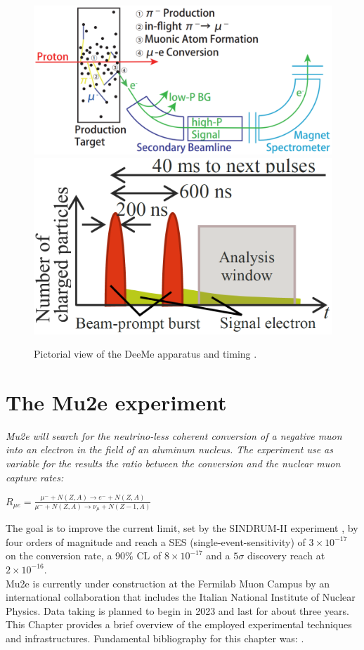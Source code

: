 \documentclass[12pt,a4paper,openright, oneside, titlepage]{book} %
\begin{document}
\begin{figure}[h!]
\centering
\includegraphics[scale=0.4]{DeeMe}
\includegraphics[scale=0.4]{DeeMe_event}
\caption[DeeMe experiment]{Pictorial view of the DeeMe apparatus and timing \cite{DeeMe}. }
\label{_DeeMe}
\end{figure}

\chapter{The Mu2e experiment}
{\itshape 
Mu2e will search for the neutrino-less coherent conversion of a negative muon into an electron in the field of an aluminum nucleus. 
The experiment use as variable for the results the ratio between the conversion and the nuclear muon capture rates:
\begin{center}
$R_{\mu e} = \frac{\mu^- + N(Z, A) \rightarrow e^- + N(Z, A)}
{\mu^- + N(Z,A) \rightarrow \nu_{\mu} + N(Z-1, A)}$
\end{center}
\noindent
The goal is to improve the current limit, set by the SINDRUM-II experiment \cite{SINDRUMII}, by four orders of magnitude and reach a SES (single-event-sensitivity) of $3\times 10^{-17}$ on the conversion rate, a 90\% CL of $8\times 10^{-17}$ and a $5\sigma$ discovery reach at $2\times 10^{-16}$.\\
Mu2e is currently under construction at the Fermilab Muon Campus by an international collaboration that includes the Italian National Institute of Nuclear Physics.
Data taking is planned to begin in 2023 and last for about three years. 
This Chapter provides a brief overview of the employed experimental techniques and infrastructures. Fundamental bibliography for this chapter was: \cite{MTDR} \cite{Signorelli} \cite{bob_cflv} \cite{bob_mu2e} \cite{Manolis}.}
\end{document}
